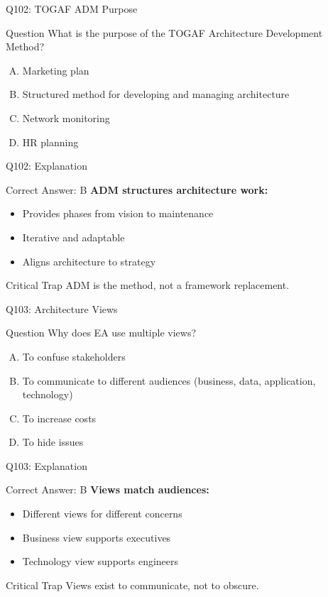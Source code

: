\documentclass{beamer}
\begin{document}
	\begin{frame}{Q102: TOGAF ADM Purpose}
		\begin{block}{Question}
			What is the purpose of the TOGAF Architecture Development Method?
		\end{block}
		\begin{enumerate}[(A)]
			\item Marketing plan
			\item Structured method for developing and managing architecture
			\item Network monitoring
			\item HR planning
		\end{enumerate}
	\end{frame}
	
	\begin{frame}{Q102: Explanation}
		\begin{block}{Correct Answer: B}
			\textbf{ADM structures architecture work:}
			\begin{itemize}
				\item Provides phases from vision to maintenance
				\item Iterative and adaptable
				\item Aligns architecture to strategy
			\end{itemize}
		\end{block}
		\begin{alertblock}{Critical Trap}
			ADM is the method, not a framework replacement.
		\end{alertblock}
	\end{frame}
	
	\begin{frame}{Q103: Architecture Views}
		\begin{block}{Question}
			Why does EA use multiple views?
		\end{block}
		\begin{enumerate}[(A)]
			\item To confuse stakeholders
			\item To communicate to different audiences (business, data, application, technology)
			\item To increase costs
			\item To hide issues
		\end{enumerate}
	\end{frame}
	
	\begin{frame}{Q103: Explanation}
		\begin{block}{Correct Answer: B}
			\textbf{Views match audiences:}
			\begin{itemize}
				\item Different views for different concerns
				\item Business view supports executives
				\item Technology view supports engineers
			\end{itemize}
		\end{block}
		\begin{alertblock}{Critical Trap}
			Views exist to communicate, not to obscure.
		\end{alertblock}
	\end{frame}
	
\end{document}
